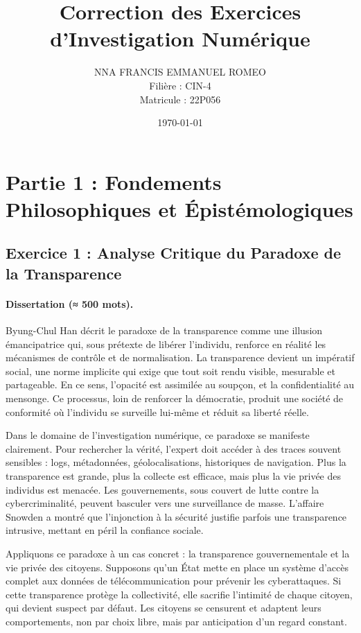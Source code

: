 \documentclass[12pt,a4paper]{article}
\title{Correction des Exercices d'Investigation Numérique}
\author{NNA FRANCIS EMMANUEL ROMEO \\ Filière : CIN-4 \\ Matricule : 22P056}
\date{\today}
\begin{document}
\maketitle

\section*{Partie 1 : Fondements Philosophiques et Épistémologiques}

\subsection*{Exercice 1 : Analyse Critique du Paradoxe de la Transparence}
\paragraph{Dissertation (≈ 500 mots).}
Byung-Chul Han décrit le paradoxe de la transparence comme une illusion émancipatrice qui, sous prétexte de libérer l'individu, renforce en réalité les mécanismes de contrôle et de normalisation. La transparence devient un impératif social, une norme implicite qui exige que tout soit rendu visible, mesurable et partageable. En ce sens, l'opacité est assimilée au soupçon, et la confidentialité au mensonge. Ce processus, loin de renforcer la démocratie, produit une société de conformité où l'individu se surveille lui-même et réduit sa liberté réelle. 

Dans le domaine de l’investigation numérique, ce paradoxe se manifeste clairement. Pour rechercher la vérité, l’expert doit accéder à des traces souvent sensibles : logs, métadonnées, géolocalisations, historiques de navigation. Plus la transparence est grande, plus la collecte est efficace, mais plus la vie privée des individus est menacée. Les gouvernements, sous couvert de lutte contre la cybercriminalité, peuvent basculer vers une surveillance de masse. L’affaire Snowden a montré que l’injonction à la sécurité justifie parfois une transparence intrusive, mettant en péril la confiance sociale.

Appliquons ce paradoxe à un cas concret : la transparence gouvernementale et la vie privée des citoyens. Supposons qu’un État mette en place un système d’accès complet aux données de télécommunication pour prévenir les cyberattaques. Si cette transparence protège la collectivité, elle sacrifie l’intimité de chaque citoyen, qui devient suspect par défaut. Les citoyens se censurent et adaptent leurs comportements, non par choix libre, mais par anticipation d’un regard constant.
\end{document}
